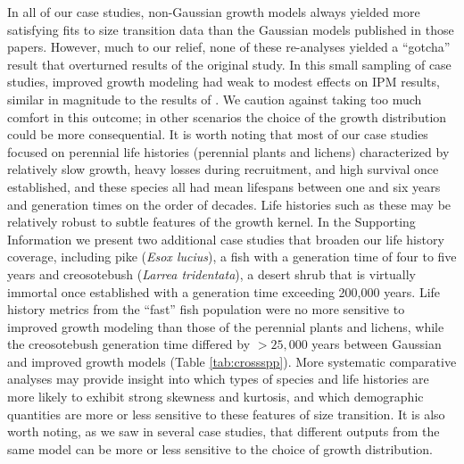 \documentclass[12pt]{article}
\begin{document}
In all of our case studies, non-Gaussian growth models always yielded more satisfying fits to size transition data than the Gaussian models published in those papers. 
However, much to our relief, none of these re-analyses yielded a ``gotcha'' result that overturned results of the original study. 
In this small sampling of case studies, improved growth modeling had weak to modest effects on IPM results, similar in magnitude to the results of \cite{peterson2019improving}. 
We caution against taking too much comfort in this outcome; in other scenarios the choice of the growth distribution could be more consequential. 
It is worth noting that most of our case studies focused on perennial life histories (perennial plants and lichens) characterized by relatively slow growth, heavy losses during recruitment, and high survival once established, and these species all had mean lifespans between one and six years and generation times on the order of decades. 
Life histories such as these may be relatively robust to subtle features of the growth kernel. 
In the Supporting Information we present two additional case studies that broaden our life history coverage, including pike (\emph{Esox lucius}), a fish with a generation time of four to five years and creosotebush (\emph{Larrea tridentata}), a desert shrub that is virtually immortal once established with a generation time exceeding 200,000 years. 
Life history metrics from the ``fast'' fish population were no more sensitive to improved growth modeling than those of the perennial plants and lichens, while the creosotebush generation time differed by $>25,000$ years between Gaussian and improved growth models (Table \ref{tab:crossspp}). 
More systematic comparative analyses may provide insight into which types of species and life histories are more likely to exhibit strong skewness and kurtosis, and which demographic quantities are more or less sensitive to these features of size transition. 
It is also worth noting, as we saw in several case studies, that different outputs from the same model can be more or less sensitive to the choice of growth distribution. 
\end{document}
